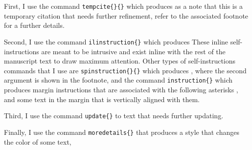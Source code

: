\documentclass[12pt,titlepage]{article}
\begin{document}
First, I use the command \texttt{tempcite\{\}\{\}} which produces  as a note that this is a temporary citation that needs further refinement, refer to the associated footnote for a further details. 

Second, I use the command \texttt{ilinstruction\{\}} which produces  These inline self-instructions are meant to be intrusive and exist inline with the rest of the manuscript text to draw maximum attention. Other types of self-instructions commands that I use are \texttt{spinstruction\{\}\{\}} which produces , where the second argument is shown in the footnote, and the command \texttt{instruction\{\}} which produces margin instructions that are associated with the following asterisks , and some text in the margin that is vertically aligned with them. 

Third, I use the command \texttt{update\{\}} to  text that needs further updating. 

Finally, I use the command \texttt{moredetails\{\}} that produces a style that changes the color of some text, 
\end{document}
